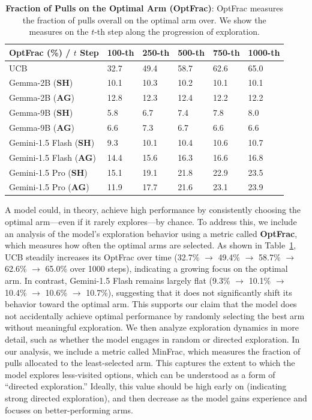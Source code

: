 \documentclass[11pt, logo]{googledeepmind}
\newcommand{\SH}{\textbf{SH}\xspace}
\newcommand{\AG}{\textbf{AG}\xspace}
\theoremstyle{plain}
\theoremstyle{definition}
\begin{document}
\begin{table}[h]
\small
\centering
\begin{tabular}{@{}llllll@{}}
\toprule
OptFrac (\%) / $t$ Step         & 100-th   & 250-th   & 500-th   & 750-th   & 1000-th                                 \\ \midrule
UCB & 32.7 & 49.4 & 58.7 & 62.6 & 65.0 \\ \midrule
Gemma-2B (\SH)& 10.1&10.3&10.2&10.1&10.1\\
Gemma-2B (\AG)& 12.8&12.3&12.4&12.2&12.2 \\ \midrule
Gemma-9B (\SH)& 5.8&6.7&7.4&7.8&8.0 \\
Gemma-9B (\AG)& 6.6&7.3&6.7&6.6&6.6 \\ \midrule
Gemini-1.5 Flash (\SH) & 9.3 & 10.1 & 10.4 & 10.6 & 10.7 \\
Gemini-1.5 Flash (\AG) & 14.4 & 15.6 & 16.3 & 16.6 & 16.8 \\ \midrule
Gemini-1.5 Pro (\SH)& 15.1&19.1&21.8&22.9&23.5 \\
Gemini-1.5 Pro (\AG)& 11.9&17.7&21.6&23.1&23.9 \\
\bottomrule
\end{tabular}
\caption{\footnotesize{\textbf{Fraction of Pulls on the Optimal Arm (OptFrac)}: OptFrac measures the fraction of pulls overall on the optimal arm over. We show the measures on the $t$-th step along the progression of exploration.}}
\label{tab:full_optimality_optfrac}
\end{table}
A model could, in theory, achieve high performance by consistently choosing the optimal arm—even if it rarely explores—by chance. To address this, we include an analysis of the model's exploration behavior using a metric called \textbf{OptFrac}, which measures how often the optimal arms are selected. As shown in Table~\ref{tab:full_optimality_optfrac}, UCB steadily increases its OptFrac over time (32.7\% $\rightarrow$ 49.4\% $\rightarrow$ 58.7\% $\rightarrow$ 62.6\% $\rightarrow$ 65.0\% over 1000 steps), indicating a growing focus on the optimal arm. In contrast, Gemini-1.5 Flash remains largely flat (9.3\% $\rightarrow$ 10.1\% $\rightarrow$ 10.4\% $\rightarrow$ 10.6\% $\rightarrow$ 10.7\%), suggesting that it does not significantly shift its behavior toward the optimal arm. This supports our claim that the model does not accidentally achieve optimal performance by randomly selecting the best arm without meaningful exploration.
We then analyze exploration dynamics in more detail, such as whether the model engages in random or directed exploration. In our analysis, we include a metric called MinFrac, which measures the fraction of pulls allocated to the least-selected arm. This captures the extent to which the model explores less-visited options, which can be understood as a form of “directed exploration.” Ideally, this value should be high early on (indicating strong directed exploration), and then decrease as the model gains experience and focuses on better-performing arms.
\end{document}
